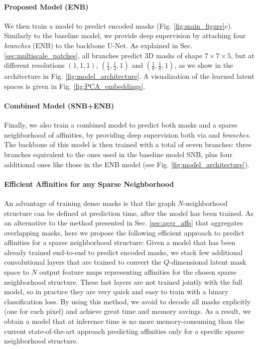 \paragraph{Proposed Model (ENB)} We then train a model to predict encoded \maskname masks (Fig. \ref{fig:main_figure}c). Similarly to the baseline model, we provide deep supervision by attaching four \emph{\encBr branches} (ENB) to the backbone U-Net. As explained in Sec. \ref{sec:multiscale_patches}, all branches predict 3D masks of shape $7 \times 7 \times 5$, but at different resolutions $(1,1,1)$, $(\frac{1}{4},\frac{1}{4},1)$ and $(\frac{1}{8},\frac{1}{8},1)$, as we show in the architecture in Fig. \ref{fig:model_architecture}. A visualization of the learned latent spaces is given in Fig. \ref{fig:PCA_embeddings}.

\paragraph{Combined Model (SNB+ENB)} Finally, we also train a combined model to predict both \maskname masks and a sparse neighborhood of affinities, by providing deep supervision both via \emph{\encBr} and \emph{\sparseBr} \emph{branches}. The backbone of this model is then trained with a total of seven branches: three branches equivalent to the ones used in the baseline model SNB, plus four additional ones like those in the ENB model (see Fig. \ref{fig:model_architecture}).  


\paragraph{Efficient Affinities for any Sparse Neighborhood}\label{sec:efficient_affs}
An advantage of training dense \maskname masks is that the graph $N$-neighborhood structure can be defined at prediction time, after the model has been trained. As an alternative to the method presented in Sec. \ref{sec:aggr_affs} that aggregates overlapping masks, here we propose the following efficient approach to predict affinities for a sparse neighborhood structure: Given a model that has been already trained end-to-end to predict encoded \maskname masks, we stack few additional convolutional layers that are trained to convert the $Q$-dimensional latent mask space to $N$ output feature maps representing affinities for the chosen sparse neighborhood structure. These last layers are not trained jointly with the full model, so in practice they are very quick and easy to train with a binary classification loss. By using this method, we avoid to decode all masks explicitly (one for each pixel) and achieve great time and memory savings.
As a result, we obtain a model that at inference time is no more memory-consuming than the current state-of-the-art approach predicting affinities only for a specific sparse neighborhood structure.

